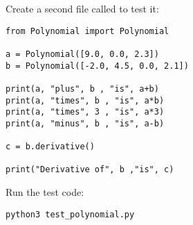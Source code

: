 Create a second file called  to test it:
\begin{Verbatim}[commandchars=\\\{\}]
from Polynomial import Polynomial

a = Polynomial([9.0, 0.0, 2.3])
b = Polynomial([-2.0, 4.5, 0.0, 2.1])

print(a, "plus", b , "is", a+b)
print(a, "times", b , "is", a*b)
print(a, "times", 3 , "is", a*3)
print(a, "minus", b , "is", a-b)

c = b.derivative()

print("Derivative of", b ,"is", c)
\end{Verbatim}

Run the test code:
\begin{Verbatim}
python3 test_polynomial.py
\end{Verbatim}
